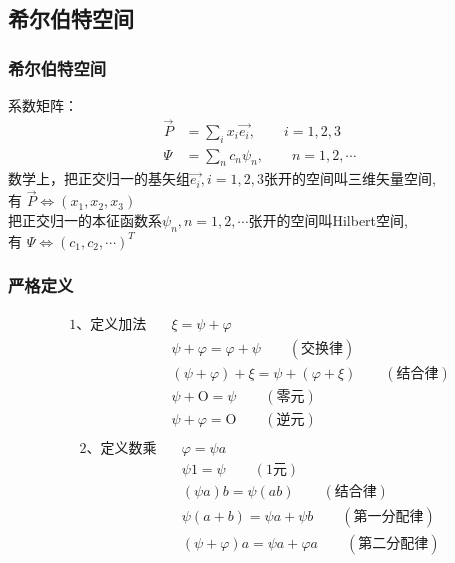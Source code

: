 \subsection{希尔伯特空间}

\begin{frame} 
    \frametitle{希尔伯特空间}
    系数矩阵：\\ \vspace{0.3em}
    \begin{equation*}
        \begin{split}
            \vec{P}&=\sum_i{x_i\vec{e_i}}, \qquad i=1,2,3 \\
            \Psi&=\sum_n c_n \psi_n, \qquad n=1,2,\cdots 
        \end{split}  
    \end{equation*}
    数学上，把正交归一的基矢组{$\vec{e_i}, i=1,2,3$}张开的空间叫三维矢量空间, \\
    有 $\vec{P}\Leftrightarrow(x_1,x_2,x_3)$\\
    把正交归一的本征函数系{$\psi_n, n=1,2,\cdots$}张开的空间叫Hilbert空间,\\
    有 $\Psi\Leftrightarrow(c_1,c_2,\cdots)^T$\\
\end{frame} 

\begin{frame} 
    \frametitle{严格定义}
    \begin{equation*}
        \begin{split}
            \text{1、定义加法} \quad  &\xi=\psi+\varphi\\
            &\psi+\varphi=\varphi+\psi \qquad (\text{交换律})\\
            &(\psi+\varphi)+\xi=\psi+(\varphi+\xi) \qquad (\text{结合律})\\
            &\psi+\text{O}= \psi \qquad (\text{零元})\\
            &\psi+\varphi= \text{O} \qquad (\text{逆元})\\
        \end{split}  
    \end{equation*}
    \begin{equation*}
        \begin{split}
            \text{2、定义数乘} \quad &\varphi=\psi a\\
            &\psi 1= \psi \qquad (\text{1元})\\
            &(\psi a)b=\psi (ab) \qquad (\text{结合律})\\
            &\psi(a+b)= \psi a+ \psi b \qquad (\text{第一分配律})\\
            &(\psi+\varphi) a= \psi a +\varphi a \qquad (\text{第二分配律})\\
        \end{split}  
    \end{equation*}
\end{frame} 

